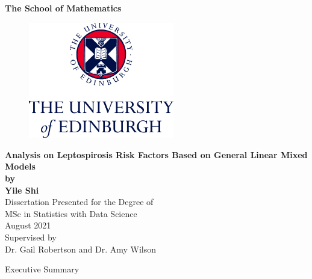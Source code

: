 \documentclass[11pt,twoside]{article}
\numberwithin{Theorem}{section}
\numberwithin{Definition}{section}
\numberwithin{Lemma}{section}
\numberwithin{Algorithm}{section}
\numberwithin{equation}{section}
\begin{document}
	
\pagestyle{empty}

\begin{titlepage}
\vspace*{.5em}
\centering
\textbf{\Large{The School of Mathematics}} \\
\vspace*{1em}
\begin{figure}[!h]
\centering
\includegraphics[width=180pt]{CentredLogoCMYK.jpg}
\end{figure}
\vspace{2em}
\textbf{\Huge{Analysis on Leptospirosis Risk Factors Based on General Linear Mixed Models}}\\[2em]
\textbf{\LARGE{by}}\\
\vspace{2em}
\textbf{\LARGE{Yile Shi}}\\
\vspace{6.5em}
\Large{Dissertation Presented for the Degree of\\
MSc in Statistics with Data Science}\\
\vspace{6.5em}
\Large{August 2021}\\
\vspace{3em}
\Large{Supervised by\\Dr. Gail Robertson and Dr. Amy Wilson}
\vfill
\end{titlepage}

\clearpage

\begin{center}
\Large{Executive Summary}
\end{center}
\end{document}
